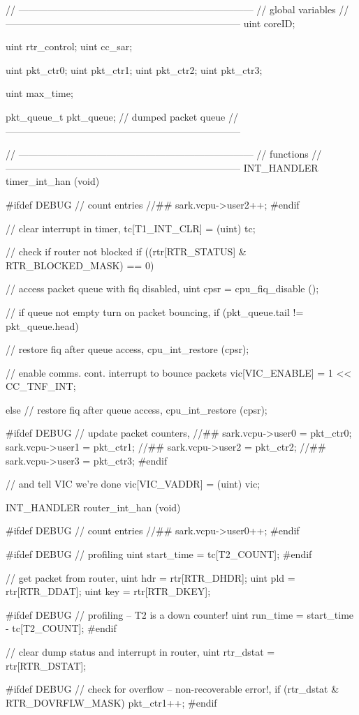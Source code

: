 \documentclass[oneside, a4paper, 11pt]{memoir}
\begin{document}
\begin{pyglist}[language=c]
// ------------------------------------------------------------------------
// global variables
// ------------------------------------------------------------------------
uint coreID;

uint rtr_control;
uint cc_sar;

uint pkt_ctr0;
uint pkt_ctr1;
uint pkt_ctr2;
uint pkt_ctr3;

uint max_time;

pkt_queue_t pkt_queue;  // dumped packet queue
// ------------------------------------------------------------------------


// ------------------------------------------------------------------------
// functions
// ------------------------------------------------------------------------
INT_HANDLER timer_int_han (void)
{
#ifdef DEBUG
// count entries //##
sark.vcpu->user2++;
#endif

// clear interrupt in timer,
tc[T1_INT_CLR] = (uint) tc;

// check if router not blocked
if ((rtr[RTR_STATUS] & RTR_BLOCKED_MASK) == 0)
{
// access packet queue with fiq disabled,
uint cpsr = cpu_fiq_disable ();

// if queue not empty turn on packet bouncing,
if (pkt_queue.tail != pkt_queue.head)
{
// restore fiq after queue access,
cpu_int_restore (cpsr);

// enable comms. cont. interrupt to bounce packets
vic[VIC_ENABLE] = 1 << CC_TNF_INT;
}
else
{
// restore fiq after queue access,
cpu_int_restore (cpsr);
}
}

#ifdef DEBUG
// update packet counters,
//##  sark.vcpu->user0 = pkt_ctr0;
sark.vcpu->user1 = pkt_ctr1;
//##  sark.vcpu->user2 = pkt_ctr2;
//##  sark.vcpu->user3 = pkt_ctr3;
#endif

// and tell VIC we're done
vic[VIC_VADDR] = (uint) vic;
}


INT_HANDLER router_int_han (void)
{
#ifdef DEBUG
// count entries //##
sark.vcpu->user0++;
#endif

#ifdef DEBUG
// profiling
uint start_time = tc[T2_COUNT];
#endif

// get packet from router,
uint hdr = rtr[RTR_DHDR];
uint pld = rtr[RTR_DDAT];
uint key = rtr[RTR_DKEY];

#ifdef DEBUG
// profiling -- T2 is a down counter!
uint run_time = start_time - tc[T2_COUNT];
#endif

// clear dump status and interrupt in router,
uint rtr_dstat = rtr[RTR_DSTAT];

#ifdef DEBUG
// check for overflow -- non-recoverable error!,
if (rtr_dstat & RTR_DOVRFLW_MASK)
pkt_ctr1++;
#endif

}
\end{pyglist}
\end{document}
